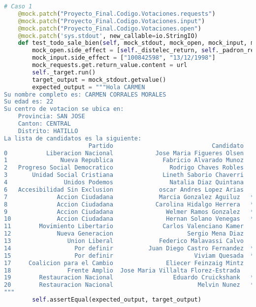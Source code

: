 \documentclass[conference]{IEEEtran}
\begin{document}
\begin{lstlisting}[language=Python, basicstyle=\tiny, breaklines=true,
    postbreak=\mbox{\textcolor{red}{$\hookrightarrow$}\space}]
    # Caso 1
    @mock.patch("Proyecto_Final.Codigo.Votaciones.requests")
    @mock.patch("Proyecto_Final.Codigo.Votaciones.input")
    @mock.patch("Proyecto_Final.Codigo.Votaciones.open")
    @mock.patch('sys.stdout', new_callable=io.StringIO)
    def test_todo_sale_bien(self, mock_stdout, mock_open, mock_input, mock_requests):
        mock_open.side_effect = [self._distelec_return, self._padron_return]
        mock_input.side_effect = ["100842598", "13/12/1998"]
        mock_requests.get.return_value.content = url
        self._target.run()
        target_output = mock_stdout.getvalue()
        expected_output = """Hola CARMEN
Su nombre completo es: CARMEN CORRALES MORALES
Su edad es: 22
Su centro de votacion se ubica en:
	Provincia: SAN JOSE
	Canton: CENTRAL
	Distrito: HATILLO
La lista de candidatos es la siguiente:
                        Partido                            Candidato    Tipo de candidato
0           Liberacion Nacional            Jose Maria Figueres Olsen    Candidato Oficial
1               Nueva Republica              Fabricio Alvarado Munoz    Candidato Oficial
2   Progreso Social Democratico                Rodrigo Chaves Robles    Candidato Oficial
3       Unidad Social Cristiana              Lineth Saborio Chaverri    Candidato Oficial
4                Unidos Podemos                Natalia Diaz Quintana    Candidato Oficial
6   Accesibilidad Sin Exclusion             oscar Andres Lopez Arias    Candidato Oficial
7              Accion Ciudadana             Marcia Gonzalez Aguiluz   **Posible Candidato
8              Accion Ciudadana            Carolina Hidalgo Herrera   **Posible Candidato
9              Accion Ciudadana               Welmer Ramos Gonzalez   **Posible Candidato
10             Accion Ciudadana               Hernan Solano Venegas   **Posible Candidato
11        Movimiento Libertario              Carlos Valenciano Kamer    Candidato Oficial
12             Nueva Generacion                     Sergio Mena Diaz    Candidato Oficial
13                Union Liberal             Federico Malavassi Calvo    Candidato Oficial
14                  Por definir          Juan Diego Castro Fernandez  **Posible Candidato
15                  Por definir                       Viviam Quesada  **Posible Candidato
17     Coalicion para el Cambio               Eliecer Feinzaig Mintz    Candidato Oficial
18                Frente Amplio  Jose Maria Villalta Florez-Estrada     Candidato Oficial
19        Restauracion Nacional                 Eduardo Cruickshank   **Posible Candidato
20        Restauracion Nacional                        Melvin Nunez   **Posible Candidato
"""
        self.assertEqual(expected_output, target_output)


\end{lstlisting}
\end{document}

